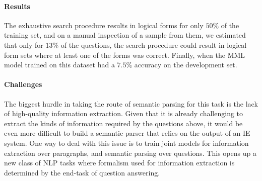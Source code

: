 \paragraph{Results}
The exhaustive search procedure results in logical forms for only $50\%$ of the
training set, and on a manual inspection of a sample from them, we estimated
that only for $13\%$ of the questions, the search procedure could result in
logical form sets where at least one of the forms was correct. Finally, when the
MML model trained on this dataset had a $7.5\%$ accuracy on the development set.

\paragraph{Challenges}
The biggest hurdle in taking the route of semantic
parsing for this task is the lack of high-quality information extraction. Given that it is
already challenging to extract the kinds of information required by the
questions above, it would be even more difficult to build a semantic parser that
relies on the output of an IE system. One way to deal with this issue is to
train joint models for information extraction over paragraphs, and semantic
parsing over questions. This opens up a new class of NLP tasks where formalism
used for information extraction is determined by the end-task of question
answering.
